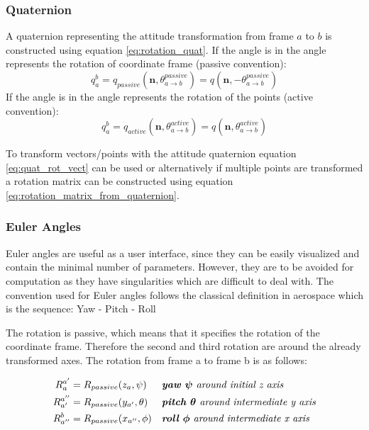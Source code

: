 \documentclass[a4paper]{paper}
\begin{document}
\subsubsection{Quaternion}

A quaternion representing the attitude transformation from frame $a$ to $b$ is constructed using equation \ref{eq:rotation_quat}.
If the angle is in the angle represents the rotation of coordinate frame (passive convention):
\begin{equation}
    q_a^b = q_{passive}(\bm n, \theta^{passive}_{a \rightarrow b}) = q(\bm n, -\theta^{passive}_{a \rightarrow b})
\end{equation}
If the angle is in the angle represents the rotation of the points (active convention):
\begin{equation}
    q_a^b = q_{active}(\bm n, \theta^{active}_{a \rightarrow b}) =  q(\bm n, \theta^{active}_{a \rightarrow b})
\end{equation}

To transform vectors/points with the attitude quaternion equation \ref{eq:quat_rot_vect} can be used or alternatively if multiple points are transformed a rotation matrix can be constructed using equation \ref{eq:rotation_matrix_from_quaternion}.

\subsubsection{Euler Angles}

Euler angles are useful as a user interface, since they can be easily visualized and contain the minimal number of parameters. However, they are to be avoided for computation as they have singularities which are difficult to deal with.
The convention used for Euler angles follows the classical definition in aerospace which is the sequence: Yaw - Pitch - Roll

The rotation is passive, which means that it specifies the rotation of the coordinate frame. Therefore the second and third rotation are around the already transformed axes.
The rotation from frame a to frame b is as follows:

\begin{equation}
\begin{aligned}
    R_a^{a'} &= R_{passive}(z_a, \psi) && \textit{\textbf{yaw $\bm\psi$} around initial z axis} \\
    R_{a'}^{a''} &= R_{passive}(y_{a'}, \theta) && \textit{\textbf{pitch $\bm\theta$} around intermediate y axis} \\
    R_{a''}^{b} &= R_{passive}(x_{a''}, \phi) && \textit{\textbf{roll $\bm\phi$} around intermediate x axis}
\end{aligned}
\end{equation}
\end{document}
